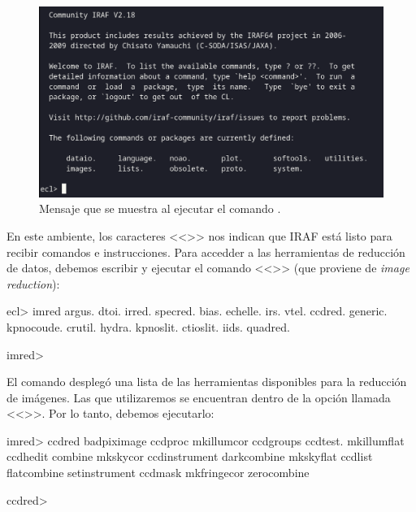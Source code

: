 \begin{figure}[htb]
  \centering
	\includegraphics[width=\textwidth]{figures/ecl-output.png}
	\caption{Mensaje que se muestra al ejecutar el comando .}
	\label{fig:ecl-output} 
\end{figure}

En este ambiente, los caracteres <<>> nos indican que IRAF está listo para recibir comandos e instrucciones. Para accedder a las herramientas de reducción de datos, debemos escribir y ejecutar el comando <<>> (que proviene de \emph{image reduction}):

\begin{bash}
ecl> imred
      argus.       dtoi.        irred.       specred.
      bias.        echelle.     irs.         vtel.
      ccdred.      generic.     kpnocoude.   
      crutil.      hydra.       kpnoslit.    
      ctioslit.    iids.        quadred.     

imred> 
\end{bash}

El comando  desplegó una lista de las herramientas disponibles para la reducción de imágenes. Las que utilizaremos se encuentran dentro de la opción llamada <<>>. Por lo tanto, debemos ejecutarlo:

\begin{bash}
imred> ccdred
      badpiximage       ccdproc           mkillumcor
      ccdgroups         ccdtest.          mkillumflat
      ccdhedit          combine           mkskycor
      ccdinstrument     darkcombine       mkskyflat
      ccdlist           flatcombine       setinstrument
      ccdmask           mkfringecor       zerocombine

ccdred>
\end{bash}

